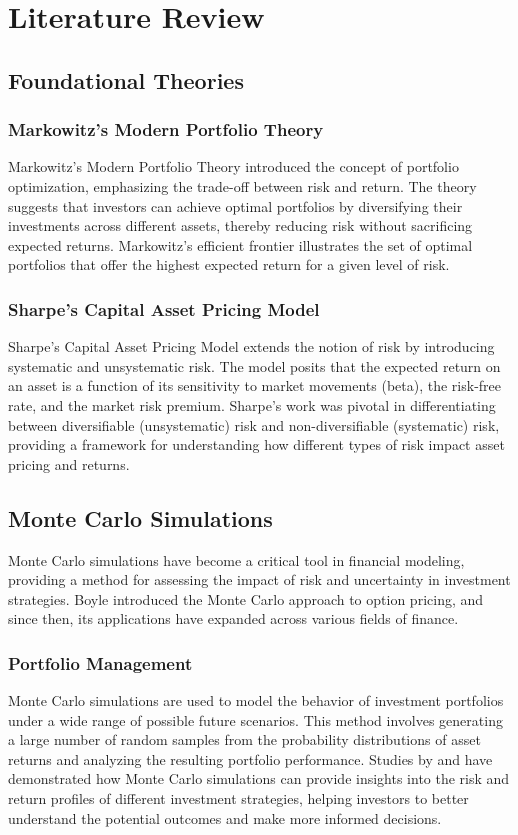 \section{Literature Review}
\subsection{Foundational Theories}

\subsubsection{Markowitz's Modern Portfolio Theory}
Markowitz's Modern Portfolio Theory \citep{markowitz1952portfolio} introduced the concept of portfolio optimization, emphasizing the trade-off between risk and return. The theory suggests that investors can achieve optimal portfolios by diversifying their investments across different assets, thereby reducing risk without sacrificing expected returns. Markowitz's efficient frontier illustrates the set of optimal portfolios that offer the highest expected return for a given level of risk. 

\subsubsection{Sharpe's Capital Asset Pricing Model}
Sharpe's Capital Asset Pricing Model \citep{sharpe1964capital} extends the notion of risk by introducing systematic and unsystematic risk. The model posits that the expected return on an asset is a function of its sensitivity to market movements (beta), the risk-free rate, and the market risk premium. Sharpe's work was pivotal in differentiating between diversifiable (unsystematic) risk and non-diversifiable (systematic) risk, providing a framework for understanding how different types of risk impact asset pricing and returns.

\subsection{Monte Carlo Simulations}
Monte Carlo simulations have become a critical tool in financial modeling, providing a method for assessing the impact of risk and uncertainty in investment strategies. Boyle \citep{boyle1977options} introduced the Monte Carlo approach to option pricing, and since then, its applications have expanded across various fields of finance. 

\subsubsection{Portfolio Management}
Monte Carlo simulations are used to model the behavior of investment portfolios under a wide range of possible future scenarios. This method involves generating a large number of random samples from the probability distributions of asset returns and analyzing the resulting portfolio performance. Studies by \citet{glasserman2004monte} and \citet{chan2005monte} have demonstrated how Monte Carlo simulations can provide insights into the risk and return profiles of different investment strategies, helping investors to better understand the potential outcomes and make more informed decisions.

